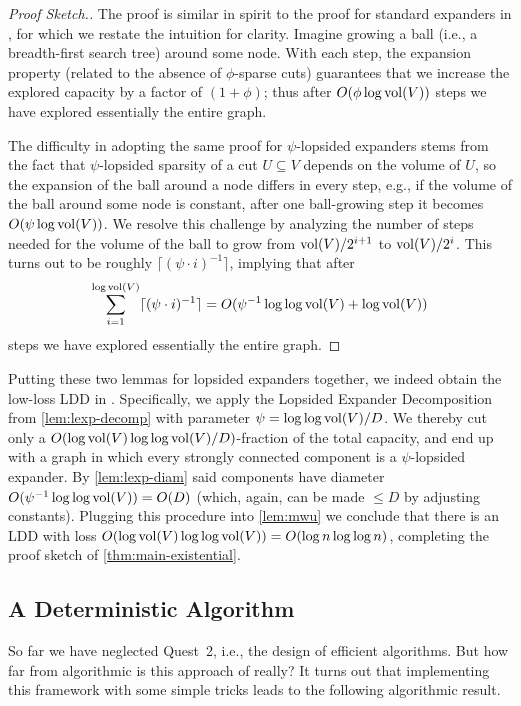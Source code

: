 \documentclass[letterpaper,11pt]{article}
\begin{document}
\begin{proof}[Proof Sketch.]
	The proof is similar in spirit to the proof for standard expanders in , for which we restate the intuition for clarity. Imagine growing a ball (i.e., a breadth-first search tree) around some node. With each step, the expansion property (related to the absence of $\phi$-sparse cuts) guarantees that we increase the explored capacity by a factor of $(1 + \phi)$; thus after $O(\phi \log \operatorname{vol}(V))$ steps we have explored essentially the entire graph.
	
	The difficulty in adopting the same proof for $\psi$-lopsided expanders stems from the fact that $\psi$-lopsided sparsity of a cut $U \subseteq V$ depends on the volume of $U$, so the expansion of the ball around a node differs in every step, e.g., if the volume of the ball around some node is constant, after one ball-growing step it becomes $O(\psi \log \operatorname{vol}(V))$. We resolve this challenge by analyzing the number of steps needed for the volume of the ball to grow from $\operatorname{vol}(V)/2^{i+1}$ to $\operatorname{vol}(V)/2^{i}$. This turns out to be roughly $\lceil (\psi \cdot i)^{-1} \rceil$, implying that after
	\begin{equation*}
		\sum_{i=1}^{\log \operatorname{vol}(V)} \lceil (\psi \cdot i)^{-1} \rceil = O(\psi^{-1} \log\log \operatorname{vol}(V) + \log \operatorname{vol}(V)) 
	\end{equation*}
	steps we have explored essentially the entire graph.
\end{proof}

Putting these two lemmas for lopsided expanders together, we indeed obtain the low-loss LDD in . Specifically, we apply the Lopsided Expander Decomposition from \cref{lem:lexp-decomp} with parameter $\psi = \log\log \operatorname{vol}(V) / D$. We thereby cut only a $O(\log \operatorname{vol}(V) \log\log \operatorname{vol}(V) / D)$-fraction of the total capacity, and end up with a graph in which every strongly connected component is a $\psi$-lopsided expander. By \cref{lem:lexp-diam} said components have diameter $O(\psi^{-1} \log\log \operatorname{vol}(V)) = O(D)$ (which, again, can be made $\leq D$ by adjusting constants). Plugging this procedure into \cref{lem:mwu} we conclude that there is an LDD with loss $O(\log \operatorname{vol}(V) \log\log \operatorname{vol}(V)) = O(\log n \log\log n)$, completing the proof sketch of \cref{thm:main-existential}.

\subsection{A Deterministic Algorithm} \label{sec:overviewDet}
So far we have neglected Quest~2, i.e., the design of efficient algorithms. But how far from algorithmic is this approach of  really? It turns out that implementing this framework with some simple tricks leads to the following algorithmic result.
\end{document}

